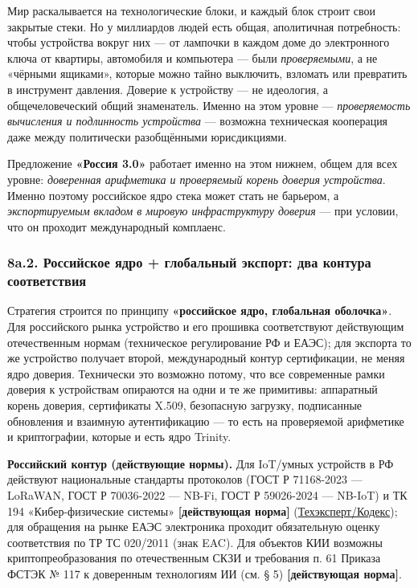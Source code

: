 \documentclass[
  russian,
]{article}
\begin{document}
Мир раскалывается на технологические блоки, и каждый блок строит свои
закрытые стеки. Но у миллиардов людей есть общая, аполитичная
потребность: чтобы устройства вокруг них --- от лампочки в каждом доме
до электронного ключа от квартиры, автомобиля и компьютера --- были
\emph{проверяемыми}, а не «чёрными ящиками», которые можно тайно
выключить, взломать или превратить в инструмент давления. Доверие к
устройству --- не идеология, а общечеловеческий общий знаменатель.
Именно на этом уровне --- \emph{проверяемость вычисления и подлинность
устройства} --- возможна техническая кооперация даже между политически
разобщёнными юрисдикциями.

Предложение \textbf{«Россия 3.0»} работает именно на этом нижнем, общем
для всех уровне: \emph{доверенная арифметика и проверяемый корень
доверия устройства}. Именно поэтому российское ядро стека может стать не
барьером, а \emph{экспортируемым вкладом в мировую инфраструктуру
доверия} --- при условии, что он проходит международный комплаенс.

\subsubsection{8a.2. Российское ядро + глобальный экспорт: два контура
соответствия}\label{a.2.-ux440ux43eux441ux441ux438ux439ux441ux43aux43eux435-ux44fux434ux440ux43e-ux433ux43bux43eux431ux430ux43bux44cux43dux44bux439-ux44dux43aux441ux43fux43eux440ux442-ux434ux432ux430-ux43aux43eux43dux442ux443ux440ux430-ux441ux43eux43eux442ux432ux435ux442ux441ux442ux432ux438ux44f}

Стратегия строится по принципу \textbf{«российское ядро, глобальная
оболочка»}. Для российского рынка устройство и его прошивка
соответствуют действующим отечественным нормам (техническое
регулирование РФ и ЕАЭС); для экспорта то же устройство получает второй,
международный контур сертификации, не меняя ядро доверия. Технически это
возможно потому, что все современные рамки доверия к устройствам
опираются на одни и те же примитивы: аппаратный корень доверия,
сертификаты X.509, безопасную загрузку, подписанные обновления и
взаимную аутентификацию --- то есть на проверяемой арифметике и
криптографии, которые и есть ядро Trinity.

\textbf{Российский контур (действующие нормы).} Для IoT/умных устройств
в РФ действуют национальные стандарты протоколов (ГОСТ Р 71168-2023 ---
LoRaWAN, ГОСТ Р 70036-2022 --- NB-Fi, ГОСТ Р 59026-2024 --- NB-IoT) и ТК
194 «Кибер-физические системы» \textbf{{[}действующая норма{]}}
(\href{https://docs.cntd.ru/document/1304463285}{Техэксперт/Кодекс});
для обращения на рынке ЕАЭС электроника проходит обязательную оценку
соответствия по ТР ТС 020/2011 (знак EAC). Для объектов КИИ возможны
криптопреобразования по отечественным СКЗИ и требования п. 61 Приказа
ФСТЭК № 117 к доверенным технологиям ИИ (см. § 5) \textbf{{[}действующая
норма{]}}.
\end{document}

